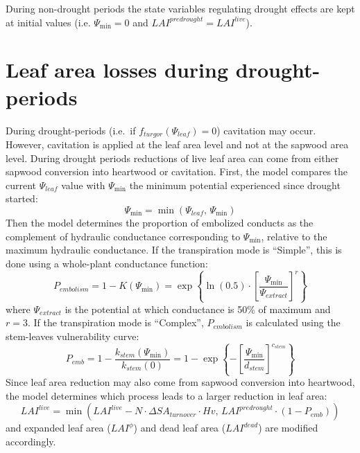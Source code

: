\documentclass[]{book}
\begin{document}
During non-drought periods the state variables regulating drought effects are kept at initial values (i.e. \(\Psi_{\min} = 0\) and \(LAI^{predrought} = LAI^{live}\)).

\hypertarget{leaf-area-losses-during-drought-periods}{%
\section{Leaf area losses during drought-periods}\label{leaf-area-losses-during-drought-periods}}

During drought-periods (i.e.~if \(f_{turgor}(\Psi_{leaf})=0\)) cavitation may occur. However, cavitation is applied at the leaf area level and not at the sapwood area level. During drought periods reductions of live leaf area can come from either sapwood conversion into heartwood or cavitation. First, the model compares the current \(\Psi_{leaf}\) value with \(\Psi_{\min}\) the minimum potential experienced since drought started:
\begin{equation}
\Psi_{\min} = \min(\Psi_{leaf}, \, \Psi_{\min})
\end{equation}
Then the model determines the proportion of embolized conducts as the complement of hydraulic conductance corresponding to \(\Psi_{\min}\), relative to the maximum hydraulic conductance. If the transpiration mode is ``Simple'', this is done using a whole-plant conductance function:
\begin{equation}
P_{embolism}=1- K(\Psi_{\min}) = \exp \left \{\ln{(0.5)}\cdot \left[ \frac{\Psi_{\min}}{\Psi_{extract}} \right] ^r \right \} 
\end{equation}
where \(\Psi_{extract}\) is the potential at which conductance is 50\% of maximum and \(r=3\). If the transpiration mode is ``Complex'', \(P_{embolism}\) is calculated using the stem-leaves vulnerability curve:
\begin{equation}
P_{emb}= 1- \frac{k_{stem}(\Psi_{\min})}{k_{stem}(0)} = 1 - \exp \left \{-\left[ \frac{\Psi_{\min}}{d_{stem}} \right] ^{c_{stem}} \right \} 
\end{equation}
Since leaf area reduction may also come from sapwood conversion into heartwood, the model determines which process leads to a larger reduction in leaf area:
\begin{equation}
LAI^{live} = \min(LAI^{live} - N \cdot \Delta SA_{turnover} \cdot Hv , \, LAI^{predrought} \cdot (1 - P_{emb}))
\end{equation}
and expanded leaf area (\(LAI^{\phi}\)) and dead leaf area (\(LAI^{dead}\)) are modified accordingly.
\end{document}
